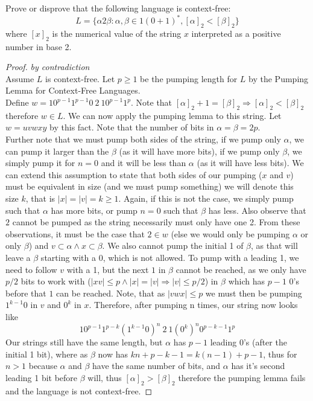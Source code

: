 \documentclass[12pt]{jhwhw}
\begin{document}
\problem{}

	Prove or disprove that the following language is context-free:
	$$
	L = \{\alpha 2\beta : \alpha,\beta \in 1(0+1)^*, [\alpha]_2 < [\beta]_2\}
	$$
	where $[x]_2$ is the numerical value of the string $x$ interpreted as a positive number in base 2.

\solution

	\begin{proof} \textit{by contradiction} \\
		Assume $L$ is context-free. 
		Let $p\geq 1$ be the pumping length for $L$ by the Pumping Lemma for Context-Free Languages. \\
		Define $w=10^{p-1}1^{p-1}0\ 2\ 10^{p-1}1^p$. 
		Note that $[\alpha]_2+1 = [\beta]_2 \Rightarrow [\alpha]_2 < [\beta]_2$ 
		therefore $w\in L$. We can now apply the pumping lemma to this string.
		Let $w=uvwxy$ by this fact. 
		\bigbreak
		Note that the number of bits in $\alpha=\beta=2p$. \\
		Further note that we must pump both sides of the string, if we pump only $\alpha$, we can pump
		it larger than the $\beta$ (as it will have more bits), if we pump only $\beta$, we simply pump it for
		$n=0$ and it will be less than $\alpha$ (as it will have less bits). We can extend this assumption to
		state that both sides of our pumping ($x$ and $v$) must be equivalent in size (and we must pump something)
		we will denote this size $k$, that is $|x|=|v|=k\geq 1$. Again, if this is
		not the case, we simply pump such that $\alpha$ has more bits, or pump $n=0$ such that $\beta$ has less.
		Also observe that $2$ cannot be pumped as the string necessarily must only have one 2. 
		From these observations, it must be the case that
		$2\in w$ (else we would only be pumping $\alpha$ or only $\beta$) 
		and $v\subset \alpha \land x\subset \beta$.
		We also cannot pump the initial 1 of $\beta$, as that will leave a $\beta$ starting with a 0, which is
		not allowed. To pump with a leading 1, we need to follow $v$ with a 1, but the next $1$ in $\beta$ cannot
		be reached, as we only have $p/2$ bits to work with ($|xv|\leq p \land |x|=|v|\Rightarrow |v|\leq p/2$) 
		in $\beta$ which has $p-1$ 
		0's before 
		that $1$ can be reached.
		\bigbreak
		Note, that as $|vwx|\leq p$ we must then be pumping $1^{k-1}0$ in $v$ and $0^{k}$ in $x$.
		Therefore, after pumping n times, our string now looks like
		$$
			10^{p-1}1^{p-k}(1^{k-1}0)^n\ 2\ 1(0^k)^n0^{p-k-1}1^p
		$$
		Our strings still have the same length, but $\alpha$ has $p-1$ leading 0's (after the initial 1 bit), 
		where as $\beta$ now has $kn+p-k-1=k(n-1)+p-1$, thus for $n>1$ because $\alpha$ and $\beta$ have the
		same number of bits, and $\alpha$ has it's second leading 1 bit before $\beta$ will, 
		thus $[\alpha]_2 > [\beta]_2$ therefore the pumping lemma fails and the language is not context-free.
	\end{proof}
\end{document}
